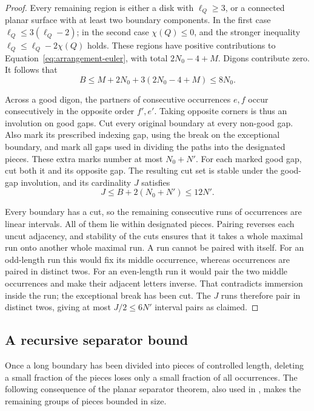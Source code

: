 \begin{proof}
Every remaining region is either a disk with $\ell_Q\ge3$, or a
connected planar surface with at least two boundary components.  In
the first case $\ell_Q\le3(\ell_Q-2)$; in the second case
$\chi(Q)\le0$, and the stronger inequality
$\ell_Q\le\ell_Q-2\chi(Q)$ holds.  These regions have positive
contributions to Equation~\ref{eq:arrangement-euler}, with total
$2N_0-4+M$.  Digons contribute zero.  It follows that
\begin{equation}
 B\le M+2N_0+3(2N_0-4+M)\le8N_0.
 \label{eq:non-good-gaps}
\end{equation}

Across a good digon, the partners of consecutive occurrences $e,f$
occur consecutively in the opposite order $f',e'$.  Taking opposite
corners is thus an involution on good gaps.  Cut every original
boundary at every non-good gap.  Also mark its prescribed indexing
gap, using the break on the exceptional boundary, and mark all gaps
used in dividing the paths into the designated pieces.  These extra
marks number at most $N_0+N'$.  For each marked good gap, cut both it
and its opposite gap.  The resulting cut set is stable under the
good-gap involution, and its cardinality $J$ satisfies
\[
 J\le B+2(N_0+N')\le12N'.
\]

Every boundary has a cut, so the remaining consecutive runs of
occurrences are linear intervals.  All of them lie within designated
pieces.  Pairing reverses each uncut adjacency, and stability of the
cuts ensures that it takes a whole maximal run onto another whole
maximal run.  A run cannot be paired with itself.  For an odd-length
run this would fix its middle occurrence, whereas occurrences are
paired in distinct twos.  For an even-length run it would pair the
two middle occurrences and make their adjacent letters inverse.
That contradicts immersion inside the run; the exceptional break has
been cut.  The $J$ runs therefore pair in distinct twos, giving at most
$J/2\le6N'$ interval pairs as claimed.
\end{proof}

\subsection{A recursive separator bound}

Once a long boundary has been divided into pieces of controlled
length, deleting a small fraction of the pieces loses only a small
fraction of all occurrences.  The following consequence of the planar
separator theorem, also used in \cite[Lemma~4.4]{OpenAI2026ZD}, makes
the remaining groups of pieces bounded in size.


